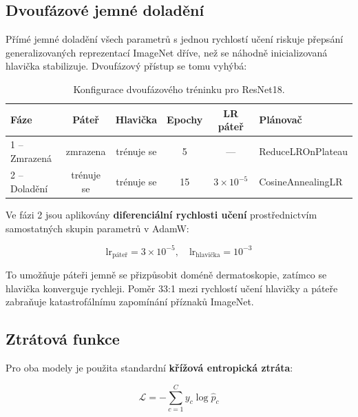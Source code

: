 \documentclass[12pt, a4paper]{article}
\begin{document}
\subsection{Dvoufázové jemné doladění}

Přímé jemné doladění všech parametrů s jednou rychlostí učení riskuje
přepsání generalizovaných reprezentací ImageNet dříve, než se náhodně
inicializovaná hlavička stabilizuje. Dvoufázový přístup se tomu vyhýbá:

\begin{table}[H]
    \centering
    \caption{Konfigurace dvoufázového tréninku pro ResNet18.}
    \begin{tabular}{lccccl}
        \toprule
        \textbf{Fáze} & \textbf{Páteř} & \textbf{Hlavička}
        & \textbf{Epochy} & \textbf{LR páteř} & \textbf{Plánovač} \\
        \midrule
        1 -- Zmrazená  & zmrazena    & trénuje se & 5  & ---              & ReduceLROnPlateau \\
        2 -- Doladění  & trénuje se  & trénuje se & 15 & $3\times10^{-5}$ & CosineAnnealingLR \\
        \bottomrule
    \end{tabular}
    \label{tab:phases}
\end{table}

Ve fázi 2 jsou aplikovány \textbf{diferenciální rychlosti učení}
prostřednictvím samostatných skupin parametrů v AdamW:

\begin{equation}
    \text{lr}_{\text{páteř}} = 3\times10^{-5}, \quad
    \text{lr}_{\text{hlavička}} = 10^{-3}
    \label{eq:diff_lr}
\end{equation}

To umožňuje páteři jemně se přizpůsobit doméně dermatoskopie, zatímco
se hlavička konverguje rychleji. Poměr 33:1 mezi rychlostí učení hlavičky
a páteře zabraňuje katastrofálnímu zapomínání příznaků ImageNet.

\subsection{Ztrátová funkce}

Pro oba modely je použita standardní \textbf{křížová entropická ztráta}:

\begin{equation}
    \mathcal{L} = -\sum_{c=1}^{C} y_c \log \hat{p}_c
    \label{eq:ce_loss}
\end{equation}
\end{document}
